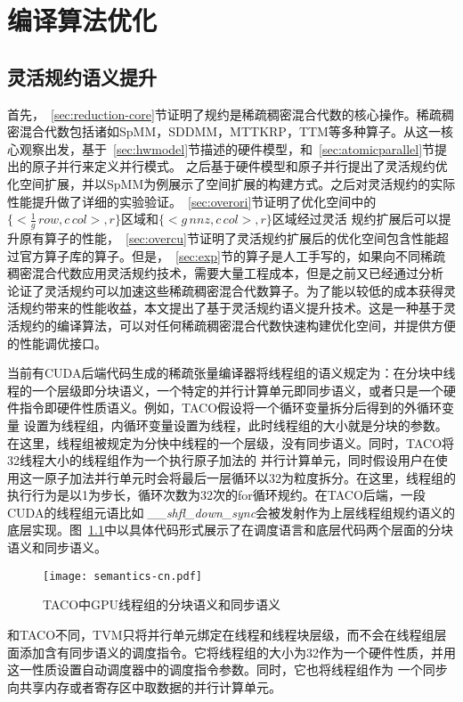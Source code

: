 
\chapter{编译算法优化}

\section{灵活规约语义提升}\label{sec:compiler-alg-intro}
首先，~\ref{sec:reduction-core}节证明了规约是稀疏稠密混合代数的核心操作。稀疏稠密混合代数包括诸如SpMM，SDDMM，MTTKRP，TTM等多种算子。从这一核心观察出发，基于~\ref{sec:hwmodel}节描述的硬件模型，和~\ref{sec:atomicparallel}节提出的原子并行来定义并行模式。
之后基于硬件模型和原子并行提出了灵活规约优化空间扩展，并以SpMM为例展示了空间扩展的构建方式。之后对灵活规约的实际性能提升做了详细的实验验证。~\ref{sec:overori}节证明了优化空间中的$\{<\frac{1}{g}\,row , c\,col>,r\}$区域和$\{<g\,nnz , c\,col>,r\}$区域经过灵活
规约扩展后可以提升原有算子的性能，~\ref{sec:overcu}节证明了灵活规约扩展后的优化空间包含性能超过官方算子库的算子。但是，~\ref{sec:exp}节的算子是人工手写的，如果向不同稀疏稠密混合代数应用灵活规约技术，需要大量工程成本，但是之前又已经通过分析
论证了灵活规约可以加速这些稀疏稠密混合代数算子。为了能以较低的成本获得灵活规约带来的性能收益，本文提出了基于灵活规约语义提升技术。这是一种基于灵活规约的编译算法，可以对任何稀疏稠密混合代数快速构建优化空间，并提供方便的性能调优接口。

当前有CUDA后端代码生成的稀疏张量编译器将线程组的语义规定为：在分块中线程的一个层级即分块语义，一个特定的并行计算单元即同步语义，或者只是一个硬件指令即硬件性质语义。例如，TACO假设将一个循环变量拆分后得到的外循环变量
设置为线程组，内循环变量设置为线程，此时线程组的大小就是分块的参数。在这里，线程组被规定为分快中线程的一个层级，没有同步语义。同时，TACO将32线程大小的线程组作为一个执行原子加法的
并行计算单元，同时假设用户在使用这一原子加法并行单元时会将最后一层循环以32为粒度拆分。在这里，线程组的执行行为是以1为步长，循环次数为32次的for循环规约。在TACO后端，一段CUDA的线程组元语比如
\textit{\_\_shfl\_down\_sync}会被发射作为上层线程组规约语义的底层实现。图~\ref{fig:sem}中以具体代码形式展示了在调度语言和底层代码两个层面的分块语义和同步语义。
\begin{figure}[h]%
  \centering
  \texttt{[image: semantics-cn.pdf]}
  \caption{TACO中GPU线程组的分块语义和同步语义}
  \label{fig:sem}
\end{figure}
和TACO不同，TVM只将并行单元绑定在线程和线程块层级，而不会在线程组层面添加含有同步语义的调度指令。它将线程组的大小为32作为一个硬件性质，并用这一性质设置自动调度器中的调度指令参数。同时，它也将线程组作为
一个同步向共享内存或者寄存区中取数据的并行计算单元。

